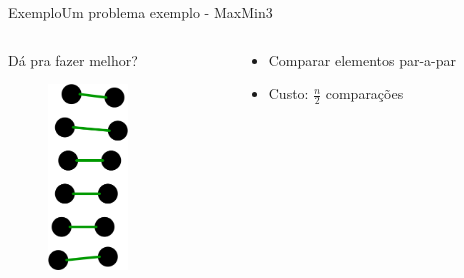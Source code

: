 \documentclass[aspectratio=169]{beamer}
\begin{document}
\begin{frame}{Exemplo}{Um problema exemplo - MaxMin3}
\begin{columns}[T] %
\begin{column}{.28\textwidth}
Dá pra fazer melhor?
\begin{figure}[!ht]
  \includegraphics[width=60pt]{imgs/maxmin3.png}
\end{figure}
\end{column}%
\hfill%
\begin{column}{.68\textwidth}
\begin{itemize}
\item Comparar elementos par-a-par
\item Custo: $\frac{n}{2}$ comparações
\end{itemize}
\end{column}%
\end{columns}
\end{frame}

\end{document}
